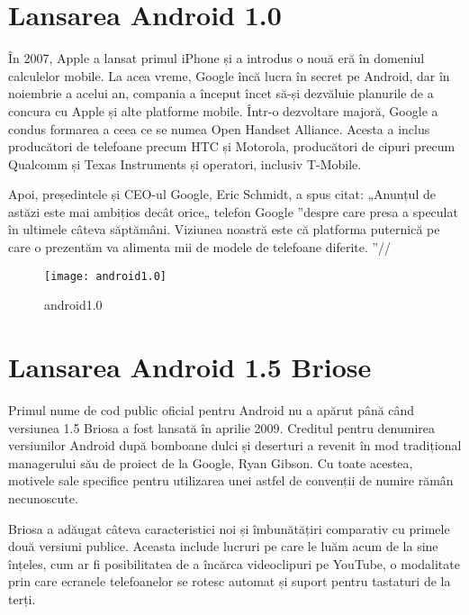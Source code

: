 \documentclass[a4paper,12pt]{amsbook}
\begin{document}
	\chapter{\Large Lansarea Android 1.0}
	\par	
   \begin{center}
   	În 2007, Apple a lansat primul iPhone și a introdus o nouă eră în domeniul calculelor mobile. La acea vreme, Google încă lucra în secret pe Android, dar în noiembrie a acelui an, compania a început încet să-și dezvăluie planurile de a concura cu Apple și alte platforme mobile. Într-o dezvoltare majoră, Google a condus formarea a ceea ce se numea Open Handset Alliance. Acesta a inclus producători de telefoane precum HTC și Motorola, producători de cipuri precum Qualcomm și Texas Instruments și operatori, inclusiv T-Mobile.\\
   \end{center}
	\vspace{0.1cm}
	\begin{center}
	Apoi, președintele și CEO-ul Google, Eric Schmidt, a spus citat: „Anunțul de astăzi este mai ambițios decât orice„ telefon Google ”despre care presa a speculat în ultimele câteva săptămâni. Viziunea noastră este că platforma puternică pe care o prezentăm va alimenta mii de modele de telefoane diferite. ”//
	\par
	\end{center}
\begin{figure}[h]
	\centering
	\texttt{[image: android1.0]}
	\caption[android]{android1.0}
	\label{fig:android1}
\end{figure}
\par
\chapter{\Large Lansarea Android 1.5 Briose}
\par	
Primul nume de cod public oficial pentru Android nu a apărut până când versiunea 1.5 Briosa a fost lansată în aprilie 2009. Creditul pentru denumirea versiunilor Android după bomboane dulci și deserturi a revenit în mod tradițional managerului său de proiect de la Google, Ryan Gibson. Cu toate acestea, motivele sale specifice pentru utilizarea unei astfel de convenții de numire rămân necunoscute.

Briosa  a adăugat câteva caracteristici noi și îmbunătățiri comparativ cu primele două versiuni publice. Aceasta include lucruri pe care le luăm acum de la sine înțeles, cum ar fi posibilitatea de a încărca videoclipuri pe YouTube, o modalitate prin care ecranele telefoanelor se rotesc automat și suport pentru tastaturi de la terți.
\end{document}
